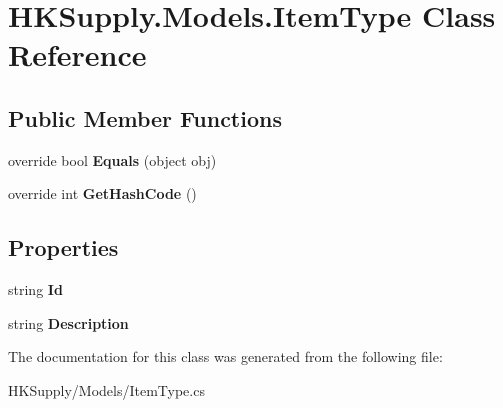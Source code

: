 \hypertarget{class_h_k_supply_1_1_models_1_1_item_type}{}\section{H\+K\+Supply.\+Models.\+Item\+Type Class Reference}
\label{class_h_k_supply_1_1_models_1_1_item_type}
\subsection*{Public Member Functions}
\begin{DoxyCompactItemize}
\item 
\mbox{\label{class_h_k_supply_1_1_models_1_1_item_type_a9c8c5733429042728d47526c51d3839e}} 
override bool {\bfseries Equals} (object obj)
\item 
\mbox{\label{class_h_k_supply_1_1_models_1_1_item_type_a0076cea6a7a1a1ee95722f580496b755}} 
override int {\bfseries Get\+Hash\+Code} ()
\end{DoxyCompactItemize}
\subsection*{Properties}
\begin{DoxyCompactItemize}
\item 
\mbox{\label{class_h_k_supply_1_1_models_1_1_item_type_a416a430061124b9c433789cf72065ed9}} 
string {\bfseries Id}
\item 
\mbox{\label{class_h_k_supply_1_1_models_1_1_item_type_a8bfbcfb496211d5f7dcca4f5716c378c}} 
string {\bfseries Description}
\end{DoxyCompactItemize}


The documentation for this class was generated from the following file\+:\begin{DoxyCompactItemize}
\item 
H\+K\+Supply/\+Models/Item\+Type.\+cs\end{DoxyCompactItemize}
